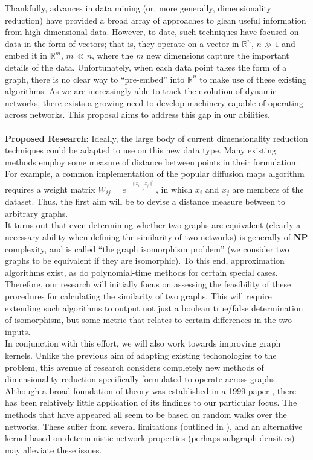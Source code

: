 \documentclass[11pt]{article}
\begin{document}
\indent Thankfully, advances in data mining (or, more generally, dimensionality reduction) have provided a broad array of approaches to glean useful information from high-dimensional data. However, to date, such techniques have focused on data in the form of vectors; that is, they operate on a vector in $\mathbb{R}^{n}$, $n\gg1$ and embed it in $\mathbb{R}^{m}$, $m \ll n$, where the $m$ new dimensions capture the important details of the data. Unfortunately, when each data point takes the form of a graph, there is no clear way to ``pre-embed'' into $\mathbb{R}^{n}$ to make use of these existing algorithms. As we are increasingly able to track the evolution of dynamic networks, there exists a growing need to develop machinery capable of operating across networks. This proposal aims to address this gap in our abilities.\\ \\
\textbf{Proposed Research:} Ideally, the large body of current dimensionality reduction techniques could be adapted to use on this new data type. Many existing methods employ some measure of distance between points in their formulation. For example, a common implementation of the popular diffusion maps algorithm requires a weight matrix $W_{ij}=e^{-\frac{\|x_{i}-x_{j}\|^{2}}{\epsilon}}$, in which $x_{i}$ and $x_{j}$ are members of the dataset. Thus, the first aim will be to devise a distance measure between to arbitrary graphs. \\
\indent It turns out that even determining whether two graphs are equivalent (clearly a necessary ability when defining the similarity of two networks) is generally of \textbf{NP} complexity, and is called ``the graph isomorphism problem'' (we consider two graphs to be equivalent if they are isomorphic). To this end, approximation algorithms exist, as do polynomial-time methods for certain special cases. Therefore, our research will initially focus on assessing the feasibility of these procedures for calculating the similarity of two graphs. This will require extending such algorithms to output not just a boolean true/false determination of isomorphism, but some metric that relates to certain differences in the two inputs. \\
\indent In conjunction with this effort, we will also work towards improving graph kernels. Unlike the previous aim of adapting existing techonologies to the problem, this avenue of research considers completely new methods of dimensionality reduction specifically formulated to operate across graphs. Although a broad foundation of theory was established in a 1999 paper \cite{haussler}, there has been relatively little application of its findings to our particular focus. The methods that have appeared all seem to be based on random walks over the networks. These suffer from several limitations (outlined in \cite{tomoyoko:randomwalksKernel}), and an alternative kernel based on deterministic network properties (perhaps subgraph densities) may alleviate these issues. \\
\end{document}
